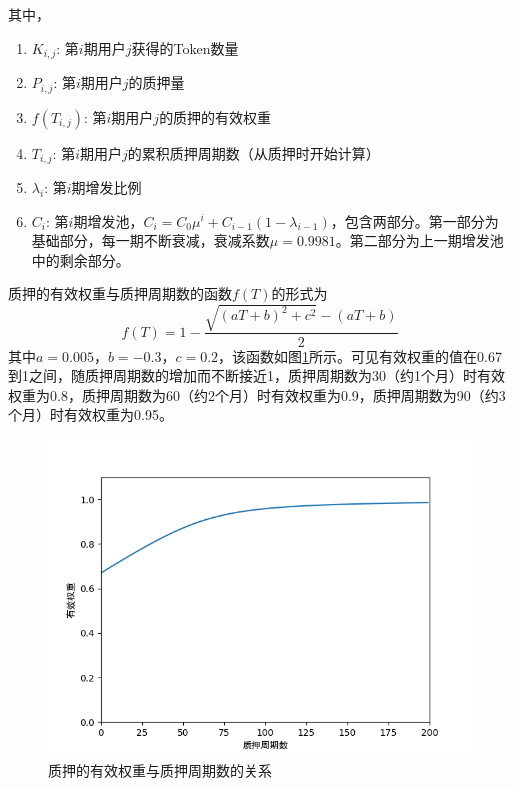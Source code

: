 其中，
\begin{enumerate}
   \item \(K_{i,j}\): 第\(i\)期用户\(j\)获得的Token数量
   \item \(P_{i,j}\): 第\(i\)期用户\(j\)的质押量
   \item \(f(T_{i,j})\): 第\(i\)期用户\(j\)的质押的有效权重
   \item \(T_{i,j}\): 第\(i\)期用户\(j\)的累积质押周期数（从质押时开始计算）
   \item \(\lambda_i\): 第\(i\)期增发比例
   \item \(C_i\): 第\(i\)期增发池，\(C_i = C_0 \mu^i + C_{i-1} (1-\lambda_{i-1})\)，包含两部分。第一部分为基础部分，每一期不断衰减，衰减系数$\mu=0.9981$。第二部分为上一期增发池中的剩余部分。
\end{enumerate}

质押的有效权重与质押周期数的函数\(f(T)\)的形式为
  \begin{equation}
    f(T) = 1 - \frac{\sqrt{(aT+b)^2+c^2}-(aT+b)}{2}
  \end{equation}
其中\(a=0.005\)，\(b=-0.3\)，\(c=0.2\)，该函数如图\ref{weight}所示。可见有效权重的值在0.67到1之间，随质押周期数的增加而不断接近1，质押周期数为30（约1个月）时有效权重为0.8，质押周期数为60（约2个月）时有效权重为0.9，质押周期数为90（约3个月）时有效权重为0.95。
 \begin{figure}
   \centering
   \includegraphics[scale=0.4]{../common/weight.png}
   \caption{质押的有效权重与质押周期数的关系}\label{weight}
 \end{figure}

